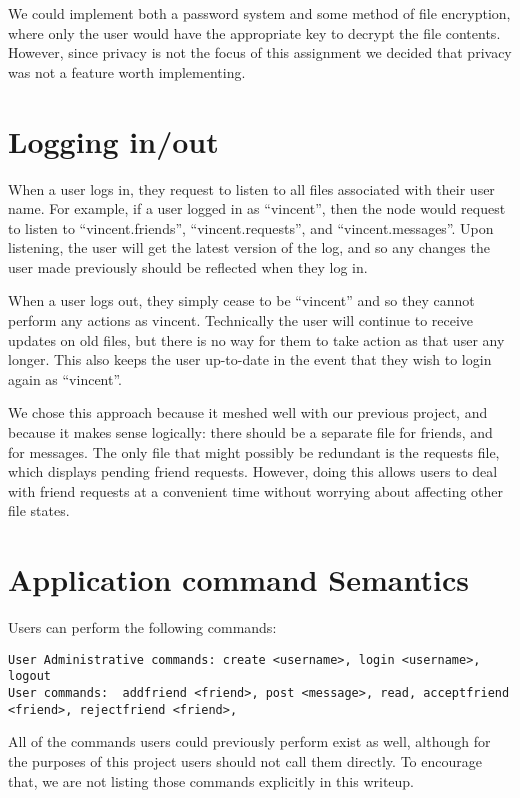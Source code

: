 \documentclass[11pt]{article}
\begin{document}
We could implement both a password system and some method of file encryption, where only the user would have the appropriate key to decrypt the file contents. However, since privacy is not the focus of this assignment we decided that privacy was not a feature worth implementing. 

\section{Logging in/out}

When a user logs in, they request to listen to all files associated with their user name. For example, if a user logged in as ``vincent'', then the node would request to listen to ``vincent.friends'', ``vincent.requests'', and ``vincent.messages''. Upon listening, the user will get the latest version of the log, and so any changes the user made previously should be reflected when they log in. 

When a user logs out, they simply cease to be ``vincent'' and so they cannot perform any actions as vincent. Technically the user will continue to receive updates on old files, but there is no way for them to take action as that user any longer. This also keeps the user up-to-date in the event that they wish to login again as ``vincent''.

We chose this approach because it meshed well with our previous project, and because it makes sense logically: there should be a separate file for friends, and for messages. The only file that might possibly be redundant is the requests file, which displays pending friend requests. However, doing this allows users to deal with friend requests at a convenient time without worrying about affecting other file states.

\section{Application command Semantics}

Users can perform the following commands:
\begin{verbatim}
User Administrative commands: create <username>, login <username>, logout
User commands:  addfriend <friend>, post <message>, read, acceptfriend <friend>, rejectfriend <friend>,
\end{verbatim}

All of the commands users could previously perform exist as well, although for the purposes of this project users should not call them directly. To encourage that, we are not listing those commands explicitly in this writeup.
\end{document}

